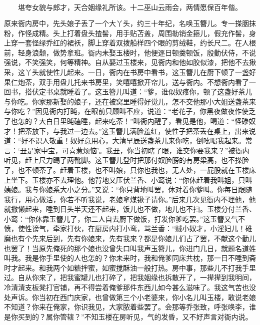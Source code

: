 \[
堪夸女貌与郎才，天合姻缘礼所该。
十二巫山云雨会，两情愿保百年偕。
\]

原来衙内房中，先头娘子丢了一个大丫头，约三十年纪，名唤玉簪儿。专一搽胭抹粉，作怪成精。头上打着盘头揸髻，用手贴苫盖，周围勒销金箍儿，假充作髻，身上穿一套怪绿乔红的裙袄，脚上穿着双拨船样四个眼的剪绒鞋，约长尺二。在人根前，轻身浪颡，做势拿班。衙内未娶玉楼时，他便逐日顿羹顿饭，殷勤伏侍，不说强说，不笑强笑，何等精神。自从娶过玉楼来，见衙内和他如胶似漆，把他不去揪采，这丫头就使性儿起来。一日，衙内在书房中看书，这玉簪儿在厨下顿了一盏好果仁炮茶，双手用盘儿托来书房里，笑嘻嘻掀开帘儿，送与衙内。不想衙内看了一回书，搭伏定书桌就睡着了。这玉簪儿叫道：“爹，谁似奴疼你，顿了这盏好茶儿与你吃。你家那新娶的娘子，还在被窝里睡得好觉儿，怎不交他那小大姐送盏茶来与你吃？”因见衙内打盹，在眼前只顾叫不应，说道：“老花子，你黑夜做夜作使乏了也怎的？大白日里盹磕睡，起来吃茶！”叫衙内醒了，看见是他，喝道：“怪碜奴才！把茶放下，与我过一边去。”这玉簪儿满脸羞红，使性子把茶丢在桌上，出来说道：“好不识人敬重！奴好意用心，大清早辰送盏茶儿来你吃，倒吆喝我起来。常言：‘丑是家中宝，可喜惹烦恼’。我丑，你当初瞎了眼，谁交你要我来？”被衙内听见，赶上尺力踢了两靴脚。这玉簪儿登时把那付奴脸膀的有房梁高，也不搽脸了，也不顿茶了。赶着玉楼，也不叫娘，只你也我也，无人处，一屁股就在玉楼床上坐下。玉楼亦不去理他。他背地又压伏兰香、小鸾说：“你休赶着我叫姐，只叫姨娘。我与你娘系大小之分。”又说：“你只背地叫罢，休对着你爹叫。你每日跟随我行，用心做活，你若不听我说，老娘拿煤锹子请你。”后来几次见衙内不理他，他就撒懒起来，睡到日头半天还不起来，饭儿也不做，地儿也不扫。玉楼分付兰香、小鸾：“你休靠玉簪儿了，你二人自去厨下做饭，打发你爹吃罢。”这玉簪又气不愤，使性谤气，牵家打伙，在厨房内打小鸾，骂兰香：“贼小奴才，小淫妇儿！碓磨也有个先来后到，先有你娘来，先有我来？都是你娘儿们占了罢，不献这个勤儿也罢了！当原先俺死的那个娘也没曾失口叫我声玉簪儿，你进门几日，就题名道姓叫我。我是你手里使的人也怎的？你未来时，我和俺爹同床共枕，那一日不睡到斋时才起来。和我两个如糖拌蜜，如蜜搅酥油一般打热。房中事，那些儿不打我手里过。自从你来了，把我蜜罐儿也打碎了，把我姻缘也拆散开了，一撵撵到我明间，冷清清支板凳打官铺，再不得尝着俺爹那件东西儿如今甚么滋味了。我这气苦也没处声诉。你当初在西门庆家，也曾做第三个小老婆来，你小名儿叫玉楼，敢说老娘不知道？你来在俺家，你识我见，大家脓着些罢了。会那等乔张致，呼张唤李，谁是你买到的？属你管辖？”不知玉楼在房听见，气的发昏，又不好声言对衙内说。

